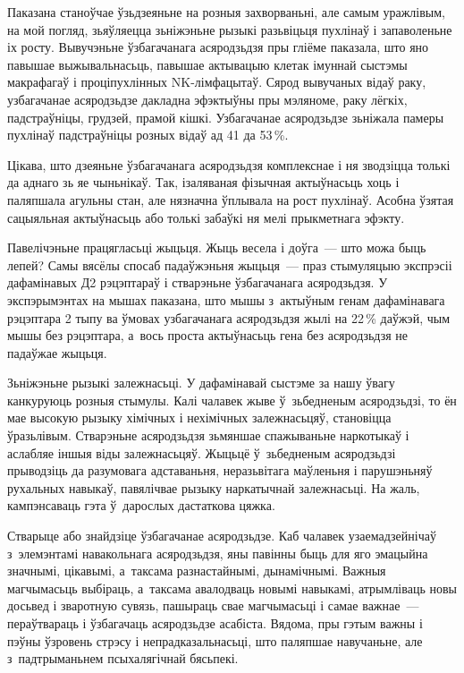 Паказана станоўчае ўзьдзеяньне на розныя захворваньні, але самым уражлівым, на мой погляд, зьяўляецца зьніжэньне рызыкі разьвіцьця пухлінаў і запаволеньне іх росту. Вывучэньне ўзбагачанага асяродзьдзя пры гліёме паказала, што яно павышае выжывальнасьць, павышае актывацыю клетак імуннай сыстэмы макрафагаў і проціпухлінных NK-лімфацытаў. Сярод вывучаных відаў раку, узбагачанае асяродзьдзе дакладна эфэктыўны пры мэляноме, раку лёгкіх, падстраўніцы, грудзей, прамой кішкі. Узбагачанае асяродзьдзе зьніжала памеры пухлінаў падстраўніцы розных відаў ад 41 да 53\,\%.

Цікава, што дзеяньне ўзбагачанага асяродзьдзя комплекснае і ня зводзіцца толькі да аднаго зь яе чыньнікаў. Так, ізаляваная фізычная актыўнасьць хоць і паляпшала агульны стан, але нязначна ўплывала на рост пухлінаў. Асобна ўзятая сацыяльная актыўнасьць або толькі забаўкі ня мелі прыкметнага эфэкту. 

Павелічэньне працягласьці жыцьця. Жыць весела і доўга~--- што можа быць лепей? Самы вясёлы спосаб падаўжэньня жыцьця~--- праз стымуляцыю экспрэсіі дафамінавых Д2 рэцэптараў і стварэньне ўзбагачанага асяродзьдзя. У экспэрымэнтах на мышах паказана, што мышы з~актыўным генам дафамінавага рэцэптара 2 тыпу ва ўмовах узбагачанага асяродзьдзя жылі на 22\,\% даўжэй, чым мышы без рэцэптара, а~вось проста актыўнасьць гена без асяродзьдзя не падаўжае жыцьця. 

Зьніжэньне рызыкі залежнасьці. У дафамінавай сыстэме за нашу ўвагу канкуруюць розныя стымулы. Калі чалавек жыве ў~зьбедненым асяродзьдзі, то ён мае высокую рызыку хімічных і нехімічных залежнасьцяў, становіцца ўразьлівым. Стварэньне асяродзьдзя зьмяншае спажываньне наркотыкаў і аслабляе іншыя віды залежнасьцяў. Жыцьцё ў~зьбедненым асяродзьдзі прыводзіць да разумовага адставаньня, неразьвітага маўленьня і парушэньняў рухальных навыкаў, павялічвае рызыку наркатычнай залежнасьці. На жаль, кампэнсаваць гэта ў~дарослых дастаткова цяжка.

Стварыце або знайдзіце ўзбагачанае асяродзьдзе. Каб чалавек узаемадзейнічаў з~элемэнтамі навакольнага асяродзьдзя, яны павінны быць для яго эмацыйна значнымі, цікавымі, а~таксама разнастайнымі, дынамічнымі. Важныя магчымасьць выбіраць, а~таксама авалодваць новымі навыкамі, атрымліваць новы досьвед і зваротную сувязь, пашыраць свае магчымасьці і самае важнае~--- пераўтвараць і ўзбагачаць асяродзьдзе асабіста. Вядома, пры гэтым важны і пэўны ўзровень стрэсу і непрадказальнасьці, што паляпшае навучаньне, але з~падтрыманьнем псыхалягічнай бясьпекі. 

